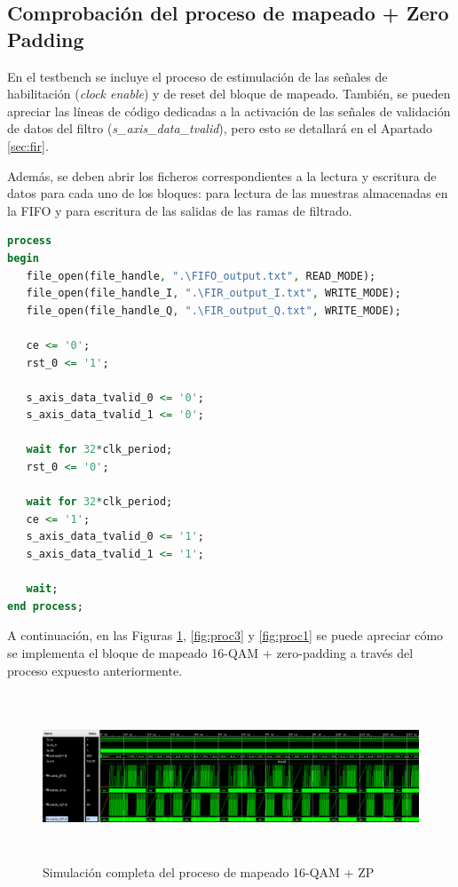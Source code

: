 \subsection{Comprobación del proceso de mapeado + Zero Padding}
\label{sec:map}

En el testbench se incluye el proceso de estimulación de las señales de habilitación (\textit{clock enable}) y de reset del bloque de mapeado. También, se pueden apreciar las líneas de código dedicadas a la activación de las señales de validación de datos del filtro (\textit{s\_axis\_data\_tvalid}), pero esto se detallará en el Apartado \ref{sec:fir}. 

\vspace{3mm}

Además, se deben abrir los ficheros correspondientes a la lectura y escritura de datos para cada uno de los bloques: para lectura de las muestras almacenadas en la FIFO y para escritura de las salidas de las ramas de filtrado.

\vspace{3mm}

\begin{lstlisting}[language=VHDL, style=mystyle, caption={Proceso de estimulación de señales de reset y clock enable}]
process
begin
   file_open(file_handle, ".\FIFO_output.txt", READ_MODE);
   file_open(file_handle_I, ".\FIR_output_I.txt", WRITE_MODE);
   file_open(file_handle_Q, ".\FIR_output_Q.txt", WRITE_MODE);
	
   ce <= '0';
   rst_0 <= '1';        
  
   s_axis_data_tvalid_0 <= '0';
   s_axis_data_tvalid_1 <= '0';
	
   wait for 32*clk_period;
   rst_0 <= '0';

   wait for 32*clk_period;
   ce <= '1';
   s_axis_data_tvalid_0 <= '1';
   s_axis_data_tvalid_1 <= '1';  
		  
   wait;
end process;  
\end{lstlisting}

\vspace{3mm}

A continuación, en las Figuras \ref{fig:proc2}, \ref{fig:proc3} y \ref{fig:proc1} se puede apreciar cómo se implementa el bloque de mapeado 16-QAM + zero-padding a través del proceso expuesto anteriormente.

\begin{figure}[h]
	\centering
	\includegraphics[width=1\textwidth,height=5cm]{img/simu/process_qam_2.PNG}
	\caption{Simulación completa del proceso de mapeado 16-QAM + ZP}
	\label{fig:proc2}
\end{figure}

